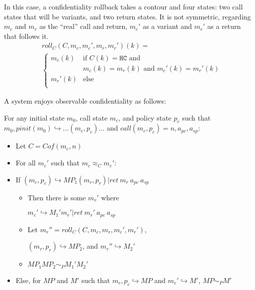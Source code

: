 \documentclass[conference]{IEEEtran}
\newcommand{\MP}{\mathit{MP}}
\begin{document}
      In this case, a confidentiality rollback takes a contour and four states: two call states
      that will be variants, and two return states. It is not symmetric, regarding \(m_c\) and \(m_r\)
      as the ``real'' call and return, \(m_c'\) as a variant and \(m_r'\) as a return that follows it.
      \[\begin{split}
        & \mathit{roll}_C(C,m_c,m_c',m_r,m_r')(k) = \\
        & \begin{cases}
          m_c(k) & \text{if } C(k) = \mathtt{HC} \text{ and } \\
                  & m_c(k) = m_r(k) \text{ and } m_c'(k) = m_r'(k) \\
          m_r'(k) & \text{else} \\
        \end{cases}
      \end{split}\]

      A system enjoys observable confidentiality as follows:

      For any initial state \(m_0\), call state \(m_c\), and policy state \(p_c\) such that
      \(m_0,\mathit{pinit}(m_0) \hookrightarrow ... (m_c,p_c) ...\) and
      \(\mathit{call}(m_c,p_c) = n, a_{pc}, a_{sp}\):

      \begin{itemize}
        \item Let \(C = \mathit{Cof}(m_c,n)\)
        \item For all \(m_c'\) such that \(m_c \approx_C m_c'\):
        \item If \((m_c,p_c) \hookrightarrow \MP_1 (m_r,p_r) | \mathit{ret}\ m_r\ a_{pc}\ a_{sp}\)
          \begin{itemize}
            \item Then there is some \(m_r'\) where

              \(m_c' \hookrightarrow M_1' m_r' | \mathit{ret}\ m_r'\ a_{pc}\ a_{sp}\)
            \item Let \(m_r'' = \mathit{roll}_C(C,m_c,m_r,m_c',m_r')\),

              \((m_r,p_r) \hookrightarrow \MP_2\), and \(m_r'' \hookrightarrow M_2'\)
            \item \(\MP_1 \MP_2 \sim_P M_1' M_2'\)
          \end{itemize}
        \item Else, for \(\MP\) and \(M'\) such that \(m_c,p_c \hookrightarrow \MP\) and \(m_c' \hookrightarrow M'\),
          \(\MP \sim_P M'\)
      \end{itemize}
\end{document}
